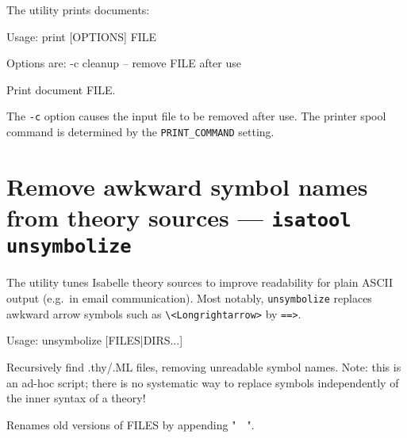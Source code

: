 The  utility prints documents:
\begin{ttbox}
Usage: print [OPTIONS] FILE

  Options are:
    -c           cleanup -- remove FILE after use

  Print document FILE.
\end{ttbox}

The \texttt{-c} option causes the input file to be removed after use.  The
printer spool command is determined by the \texttt{PRINT_COMMAND} setting.


\section{Remove awkward symbol names from theory sources --- \texttt{isatool unsymbolize}}

The  utility tunes Isabelle theory sources to improve
readability for plain ASCII output (e.g.\ in email communication).  Most
notably, \texttt{unsymbolize} replaces awkward arrow symbols such as
\verb|\<Longrightarrow>| by \verb|==>|.
\begin{ttbox}
Usage: unsymbolize [FILES|DIRS...]

  Recursively find .thy/.ML files, removing unreadable symbol names.
  Note: this is an ad-hoc script; there is no systematic way to replace
  symbols independently of the inner syntax of a theory!

  Renames old versions of FILES by appending "~~".
\end{ttbox}


